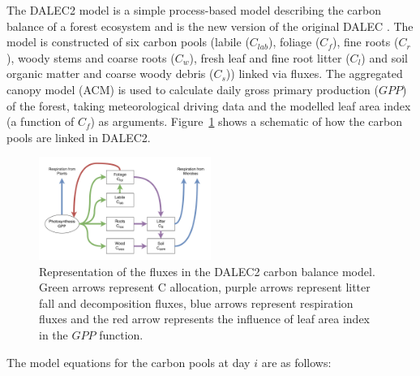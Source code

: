 \documentclass[review]{elsarticle}
\begin{document}
The DALEC2 model is a simple process-based model describing the carbon balance of a forest ecosystem \citep{Bloom2015} and is the new version of the original DALEC \citep{williams2005improved}. The model is constructed of six carbon pools (labile ($C_{lab}$), foliage ($C_f$), fine roots ($C_r$), woody stems and coarse roots ($C_w$), fresh leaf and fine root litter ($C_l$) and soil organic matter and coarse woody debris ($C_s$)) linked via fluxes. The aggregated canopy model (ACM) \citep{williams1997predicting} is used to calculate daily gross primary production ($GPP$) of the forest, taking meteorological driving data and the modelled leaf area index (a function of $C_f$) as arguments. Figure~\ref{fig:DALEC_mod} shows a schematic of how the carbon pools are linked in DALEC2.   

\begin{figure}[ht]
    \centering
    \includegraphics[width=0.5\textwidth]{dalec2diag.pdf}
    \caption{Representation of the fluxes in the DALEC2 carbon balance model. Green arrows represent C allocation, purple arrows represent litter fall and decomposition fluxes, blue arrows represent respiration fluxes and the red arrow represents the influence of leaf area index in the $GPP$ function.} \label{fig:DALEC_mod}
\end{figure}

The model equations for the carbon pools at day $i$ are as follows:
\end{document}
